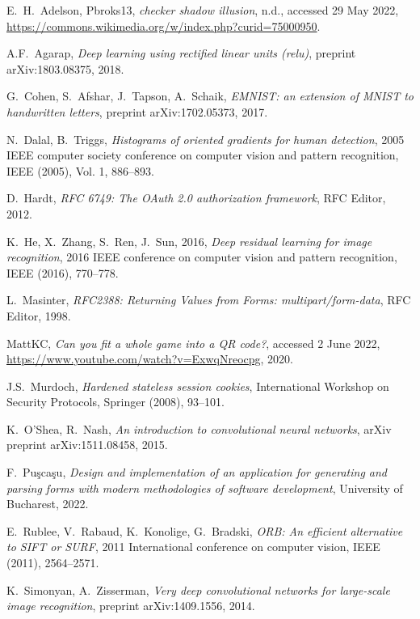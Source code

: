\documentclass[11pt, a4paper]{report}
\begin{document}
\begin{thebibliography}{99}	

E.~H.~Adelson, Pbroks13, \emph{checker shadow illusion}, n.d., accessed 29 May 2022, \url{https://commons.wikimedia.org/w/index.php?curid=75000950}.

A.F.~Agarap,
\emph{Deep learning using rectified linear units (relu)}, preprint arXiv:1803.08375, 2018.

G.~Cohen, S.~Afshar, J.~Tapson, A.~Schaik,
\emph{EMNIST: an extension of MNIST to handwritten letters}, preprint arXiv:1702.05373, 2017.

N.~Dalal, B.~Triggs,
\emph{Histograms of oriented gradients for human detection},
2005 IEEE computer society conference on computer vision and pattern recognition, IEEE (2005), Vol. 1, 886--893.

D.~Hardt,
\emph{RFC 6749: The OAuth 2.0 authorization framework}, RFC Editor, 2012.

K.~He, X.~Zhang, S.~Ren, J.~Sun, 2016,
\emph{Deep residual learning for image recognition},
2016 IEEE conference on computer vision and pattern recognition, IEEE (2016), 770--778.

L.~Masinter, 
\emph{RFC2388: Returning Values from Forms: multipart/form-data},
RFC Editor, 1998.

MattKC, \emph{Can you fit a whole game into a QR code?}, accessed 2 June 2022, \url{https://www.youtube.com/watch?v=ExwqNreocpg}, 2020.

J.S.~Murdoch,
\emph{Hardened stateless session cookies},
International Workshop on Security Protocols, Springer (2008),  93--101.

K.~O'Shea, R.~Nash,
\emph{An introduction to convolutional neural networks}, arXiv preprint
arXiv:1511.08458, 2015.

F.~Pu\c sca\c su, \emph{Design and implementation of an application for generating and parsing forms with modern methodologies of software development},
University of Bucharest, 2022.

E.~Rublee, V.~Rabaud, K.~Konolige, G.~Bradski,
\emph{ORB: An efficient alternative to SIFT or SURF},
2011 International conference on computer vision, IEEE (2011),
2564--2571.

K.~Simonyan, A.~Zisserman,
\emph{Very deep convolutional networks for large-scale image recognition}, preprint arXiv:1409.1556, 2014.


\end{thebibliography}
\end{document}
